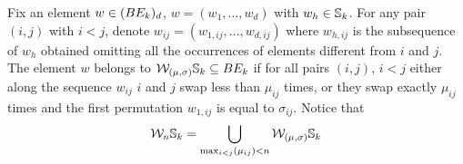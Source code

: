 \begin{definition}
	Fix an element $w \in (BE_k)_{d}$, $w=(w_{1},\dots , w_{d})$ with $w_{h}\in \mathbb{S}_k$.
	For any pair $(i,j)$ with $i< j$, denote $w_{ij}=(w_{1,ij},\dots , w_{d,ij})$ where $w_{h,ij}$ is the subsequence of $w_{h}$ obtained omitting all the occurrences of elements different from $i$ and $j$.
	The element $w$ belongs to $\mathcal{W}_{(\mu,\sigma)}\mathbb{S}_k\subseteq BE_k$ if for all pairs $(i,j)$, $i< j$ either along the sequence $w_{ij}$ $i$ and $j$ swap less than $\mu_{ij}$ times,
	or they swap exactly $\mu_{ij}$ times and the first permutation $w_{1,ij}$ is equal to $\sigma_{ij}$.
	Notice that
	\begin{equation*}
		\label{def}
		\mathcal{W}_{n}\mathbb{S}_k=\bigcup_{\max_{i<j} (\mu_{ij})< n} \mathcal{W}_{(\mu,\sigma)}\mathbb{S}_{k}
	\end{equation*}
	\\
	\\
\end{definition}
